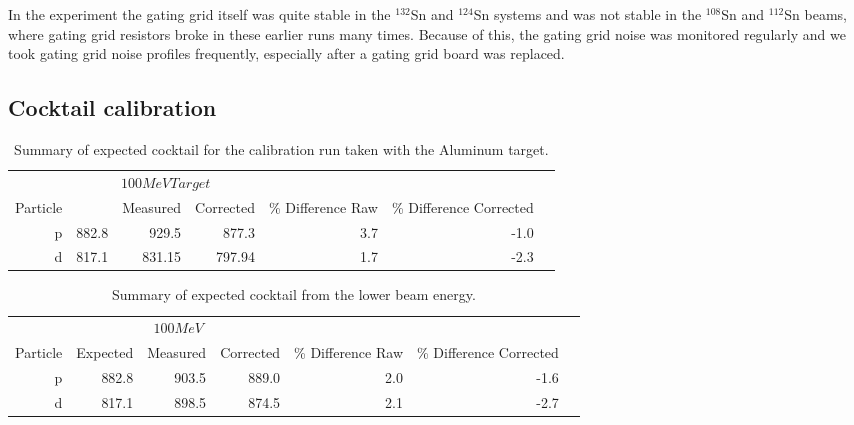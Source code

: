 In the experiment the gating grid itself was quite stable in the  ${}^{132}$Sn and ${}^{124}$Sn systems and was not stable in the ${}^{108}$Sn and ${}^{112}$Sn beams, where gating grid resistors broke in these earlier runs many times. Because of this, the gating grid noise was monitored regularly and we took gating grid noise profiles frequently, especially after a gating grid board was replaced. 



\subsection{Cocktail calibration}
\label{sec:cocktail}

\begin{table*}\centering
{}
\begin{tabular}{@{}rrrrrrr@{}}\toprule
& \multicolumn{3}{c}{$100 MeV Target$}\\
\cmidrule{2-4}
Particle &\phantom{abc} & Measured & Corrected & \% Difference Raw & \% Difference Corrected\\
\midrule
p   & 882.8 & 929.5 & 877.3   &  3.7  & -1.0  \\
d   & 817.1 & 831.15 & 797.94 &  1.7  & -2.3\\
\bottomrule
\end{tabular}
\caption{Summary of expected cocktail for the calibration run taken with the Aluminum target. }
\label{tb:cocktail100tar}
\end{table*}

\begin{table*}\centering
{}
\begin{tabular}{@{}rrrrrrr@{}}\toprule
& \multicolumn{3}{c}{$100 MeV$}\\
\cmidrule{2-4}
Particle & Expected & Measured & Corrected & \% Difference Raw & \% Difference Corrected\\
\midrule
p   & 882.8 & 903.5 & 889.0 &  2.0   & -1.6  \\
d   & 817.1 & 898.5 & 874.5 &  2.1   & -2.7\\
\bottomrule
\end{tabular}
\caption{Summary of expected cocktail from the lower beam energy.}
\label{tb:cocktail100}
\end{table*}

